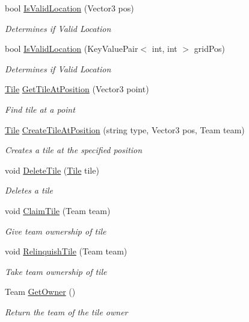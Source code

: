 \begin{DoxyCompactItemize}
bool \hyperlink{class_sector_abf04ea8c8a5a705b2b9b877d283e9993}{Is\+Valid\+Location} (Vector3 pos)
\begin{DoxyCompactList}\small\item\em Determines if Valid Location \end{DoxyCompactList}\item 
bool \hyperlink{class_sector_ab9ddf44c83d20d72535dad7469e43ee0}{Is\+Valid\+Location} (Key\+Value\+Pair$<$ int, int $>$ grid\+Pos)
\begin{DoxyCompactList}\small\item\em Determines if Valid Location \end{DoxyCompactList}\item 
\hyperlink{class_tile}{Tile} \hyperlink{class_sector_ad998ffd83c0dcb8bc99261ecfe72fb51}{Get\+Tile\+At\+Position} (Vector3 point)
\begin{DoxyCompactList}\small\item\em Find tile at a point \end{DoxyCompactList}\item 
\hyperlink{class_tile}{Tile} \hyperlink{class_sector_ac444ed54120cae14ef2b6551d2a45823}{Create\+Tile\+At\+Position} (string type, Vector3 pos, Team team)
\begin{DoxyCompactList}\small\item\em Creates a tile at the specified position \end{DoxyCompactList}\item 
void \hyperlink{class_sector_aab402113879db97b63409e2fd9df16fa}{Delete\+Tile} (\hyperlink{class_tile}{Tile} tile)
\begin{DoxyCompactList}\small\item\em Deletes a tile \end{DoxyCompactList}\item 
void \hyperlink{class_sector_a89ff1f23f9bbdf12bef9aae444f72ed4}{Claim\+Tile} (Team team)
\begin{DoxyCompactList}\small\item\em Give team ownership of tile \end{DoxyCompactList}\item 
void \hyperlink{class_sector_a89b0b70d55252a20e2fc009c2c9939ea}{Relinquish\+Tile} (Team team)
\begin{DoxyCompactList}\small\item\em Take team ownership of tile \end{DoxyCompactList}\item 
Team \hyperlink{class_sector_a1b57918142cfdc9893ff4a37c1a7fb34}{Get\+Owner} ()
\begin{DoxyCompactList}\small\item\em Return the team of the tile owner \end{DoxyCompactList}\end{DoxyCompactItemize}
